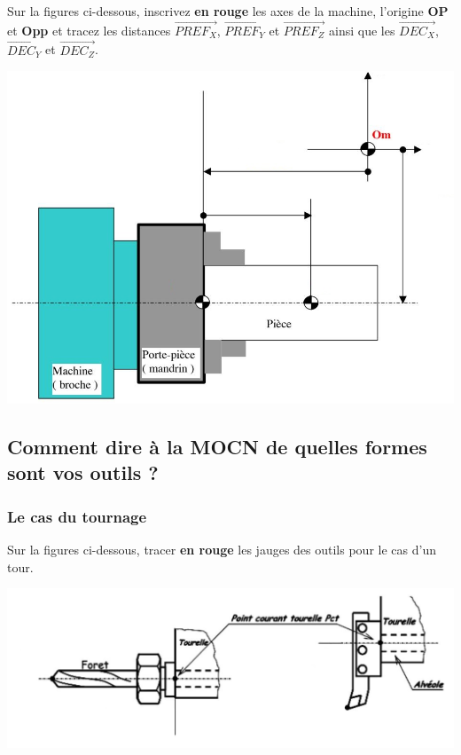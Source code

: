 \documentclass[12pt]{article}
\newcounter{exo}
\newenvironment{exo}{\stepcounter{exo}\vspace{0.5cm}{\bfseries Question \theexo\ :}}{\par\vspace{0.5cm}}
\begin{document}
\begin{exo}\label{exo1} Sur la figures ci-dessous, inscrivez \textbf{en rouge} les axes de la machine, l'origine \textbf{OP} et \textbf{Opp} et tracez les distances $\overrightarrow{PREF_X}$, $\overrightarrow{PREF_Y}$ et $\overrightarrow{PREF_Z}$ ainsi que les $\overrightarrow{DEC_X}$, $\overrightarrow{DEC_Y}$ et $\overrightarrow{DEC_Z}$.\end{exo}
\begin{center}
\includegraphics[width=0.9\linewidth]{PREFDEC1.JPG}
\end{center}


\subsection{Comment dire à la MOCN de quelles formes sont vos outils ?}

\subsubsection{Le cas du tournage}

\begin{exo}\label{exo1} Sur la figures ci-dessous, tracer \textbf{en rouge} les jauges des outils pour le cas d'un tour.\end{exo}
\includegraphics[width=1.05\linewidth]{jauge1.JPG}
\end{document}
